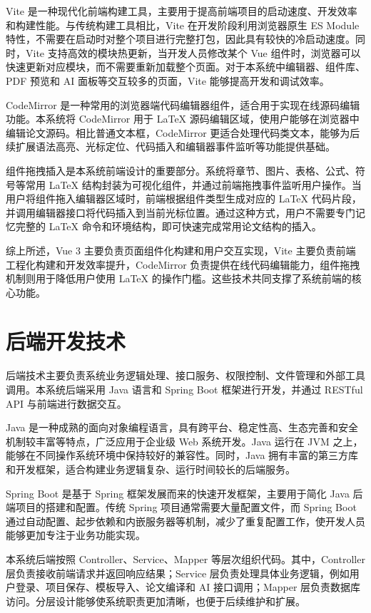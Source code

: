 \documentclass{xduugthesis}
\begin{document}
Vite 是一种现代化前端构建工具，主要用于提高前端项目的启动速度、开发效率和构建性能。与传统构建工具相比，Vite 在开发阶段利用浏览器原生 ES Module 特性，不需要在启动时对整个项目进行完整打包，因此具有较快的冷启动速度。同时，Vite 支持高效的模块热更新，当开发人员修改某个 Vue 组件时，浏览器可以快速更新对应模块，而不需要重新加载整个页面。对于本系统中编辑器、组件库、PDF 预览和 AI 面板等交互较多的页面，Vite 能够提高开发和调试效率。

CodeMirror 是一种常用的浏览器端代码编辑器组件，适合用于实现在线源码编辑功能。本系统将 CodeMirror 用于 LaTeX 源码编辑区域，使用户能够在浏览器中编辑论文源码。相比普通文本框，CodeMirror 更适合处理代码类文本，能够为后续扩展语法高亮、光标定位、代码插入和编辑器事件监听等功能提供基础。

组件拖拽插入是本系统前端设计的重要部分。系统将章节、图片、表格、公式、符号等常用 LaTeX 结构封装为可视化组件，并通过前端拖拽事件监听用户操作。当用户将组件拖入编辑器区域时，前端根据组件类型生成对应的 LaTeX 代码片段，并调用编辑器接口将代码插入到当前光标位置。通过这种方式，用户不需要专门记忆完整的 LaTeX 命令和环境结构，即可快速完成常用论文结构的插入。

综上所述，Vue 3 主要负责页面组件化构建和用户交互实现，Vite 主要负责前端工程化构建和开发效率提升，CodeMirror 负责提供在线代码编辑能力，组件拖拽机制则用于降低用户使用 LaTeX 的操作门槛。这些技术共同支撑了系统前端的核心功能。

\section{后端开发技术}
后端技术主要负责系统业务逻辑处理、接口服务、权限控制、文件管理和外部工具调用。本系统后端采用 Java 语言和 Spring Boot 框架进行开发，并通过 RESTful API 与前端进行数据交互。

Java 是一种成熟的面向对象编程语言，具有跨平台、稳定性高、生态完善和安全机制较丰富等特点，广泛应用于企业级 Web 系统开发。Java 运行在 JVM 之上，能够在不同操作系统环境中保持较好的兼容性。同时，Java 拥有丰富的第三方库和开发框架，适合构建业务逻辑复杂、运行时间较长的后端服务。

Spring Boot 是基于 Spring 框架发展而来的快速开发框架，主要用于简化 Java 后端项目的搭建和配置\cite{walls2016spring}。传统 Spring 项目通常需要大量配置文件，而 Spring Boot 通过自动配置、起步依赖和内嵌服务器等机制，减少了重复配置工作，使开发人员能够更加专注于业务功能实现。

本系统后端按照 Controller、Service、Mapper 等层次组织代码。其中，Controller 层负责接收前端请求并返回响应结果；Service 层负责处理具体业务逻辑，例如用户登录、项目保存、模板导入、论文编译和 AI 接口调用；Mapper 层负责数据库访问。分层设计能够使系统职责更加清晰，也便于后续维护和扩展。
\end{document}
